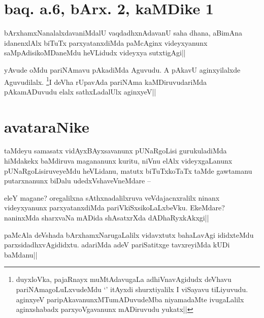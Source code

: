 \section*{baq. a.6, bArx. 2, kaMDike 1}


\begin{artha}
bArxhamxNanalalxdavaniMdalU vaqdadhxnAdavanU saha dhana, aBimAna 
idanenxlAlx biTuTx parxyatanxdiMda paMcAginx videyxyanunx 
saMpAdisikoMDaneMdu heVLidudx videyxya sutxtigAgi||
\end{artha}


\begin{artha}
yAvude oMdu pariNAmavu pAkadiMda Aguvudu. A pAkavU aginxyilalxde 
Aguvudilalx. \footnote[1]{duyxloVka, pajaRnayx muMtAdavugaLa 
adhiVnavAgidudx deVhavu pariNAmagoLuLxvudeMdu `\stext' itAyxdi 
shurxtiyalilx I viSayavu tiLiyuvudu. aginxyeV 
paripAkavanunxMTumADuvudeMba niyamadaMte ivugaLalilx aginxshabadx 
parxyoVgavanunx mADiruvudu yukatx||}I deVha rUpavAda pariNAma kaMDiruvudariMda 
pAkamADuvudu elalx sathxLadalUlx aginxyeV||
\end{artha}

\section{avataraNike}

\begin{artha}
taMdeyu samasatx vidAyxBAyxsavanunx pUNaRgoLisi gurukuladiMda 
hiMdakekx baMdiruva magananunx kuritu, niVnu elAlx videyxgaLanunx 
pUNaRgoLisiruveyeMdu heVLidanu, matutx biTuTxkoTaTx taMde gawtamanu 
putarxnanunx biDalu udedxVshaveVneMdare --
\end{artha}

\begin{artha}
eleY magane? oregalilxna sAthxnadalilxruva veVdajacnxralilx ninanx 
videyxyanunx parxyatanxdiMda pariVkiSxsikoLaLxbeVku. EkeMdare? 
naninxMda sharxvaNa mADida shAsatxrXda dADhaRyxkAkxgi||
\end{artha}


\begin{artha}
paMcAla deVshada bArxhamxNarugaLalilx vidavxtutx bahaLavAgi ididxteMdu 
parxsidadhxvAgididxtu. adariMda adeV pariSatitxge tavxreyiMda kUDi 
baMdanu||
\end{artha}

